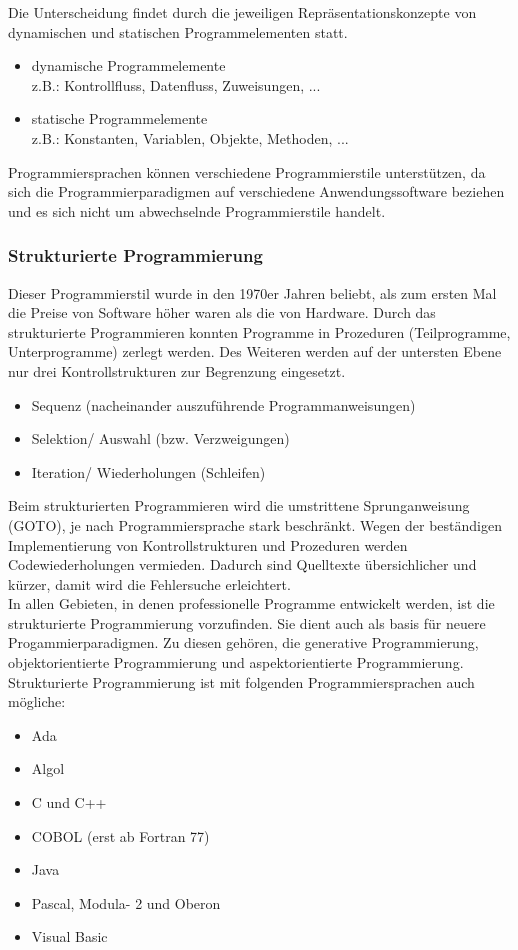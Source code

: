 \documentclass[12pt,a4paper]{report}
\begin{document}
\begin{onehalfspace}
Die Unterscheidung findet durch die jeweiligen Repräsentationskonzepte von dynamischen und statischen Programmelementen statt.
\begin{itemize}
\item dynamische Programmelemente\\
z.B.: Kontrollfluss, Datenfluss, Zuweisungen, ...
\item statische Programmelemente\\
z.B.: Konstanten, Variablen, Objekte, Methoden, ...
\end{itemize}
Programmiersprachen können verschiedene Programmierstile unterstützen, da sich die Programmierparadigmen auf verschiedene Anwendungssoftware beziehen und es sich nicht um abwechselnde Programmierstile handelt.

\subsubsection{Strukturierte Programmierung}
Dieser Programmierstil wurde in den 1970er Jahren beliebt, als zum ersten Mal die Preise von Software höher waren als die von Hardware. Durch das strukturierte Programmieren konnten Programme in Prozeduren (Teilprogramme, Unterprogramme) zerlegt werden. Des Weiteren werden auf der untersten Ebene nur drei Kontrollstrukturen zur Begrenzung eingesetzt.
\begin{itemize}
\item Sequenz (nacheinander auszuführende Programmanweisungen)
\item Selektion/ Auswahl (bzw. Verzweigungen)
\item Iteration/ Wiederholungen (Schleifen)
\end{itemize}
Beim strukturierten Programmieren wird die umstrittene Sprunganweisung (GOTO), je nach Programmiersprache stark beschränkt. Wegen der beständigen Implementierung von Kontrollstrukturen und Prozeduren werden Codewiederholungen vermieden. Dadurch sind Quelltexte übersichlicher und kürzer, damit wird die Fehlersuche erleichtert.\\

In allen Gebieten, in denen professionelle Programme entwickelt werden, ist die strukturierte Programmierung vorzufinden. Sie dient auch als basis für neuere Progammierparadigmen. Zu diesen gehören, die generative Programmierung, objektorientierte Programmierung und aspektorientierte Programmierung.
\\Strukturierte Programmierung ist mit folgenden Programmiersprachen auch mögliche:
\begin{itemize}
\item Ada
\item Algol
\item C und C++
\item COBOL (erst ab Fortran 77)
\item Java
\item Pascal, Modula- 2 und Oberon
\item Visual Basic
\end{itemize}


\end{onehalfspace}
\end{document}
